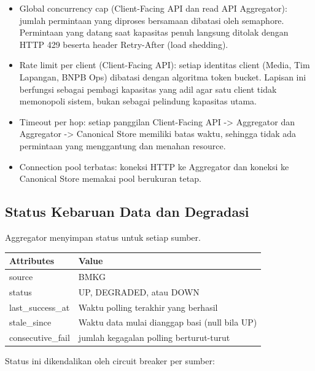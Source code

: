 \begin{itemize}
\tightlist
\item
  Global concurrency cap (Client-Facing API dan read API Aggregator): jumlah permintaan yang diproses bersamaan dibatasi oleh semaphore. Permintaan yang datang saat kapasitas penuh langsung ditolak dengan HTTP 429 beserta header Retry-After (load shedding).\\
\item
  Rate limit per client (Client-Facing API): setiap identitas client (Media, Tim Lapangan, BNPB Ops) dibatasi dengan algoritma token bucket. Lapisan ini berfungsi sebagai pembagi kapasitas yang adil agar satu client tidak memonopoli sistem, bukan sebagai pelindung kapasitas utama.\\
\item
  Timeout per hop: setiap panggilan Client-Facing API -\textgreater{} Aggregator dan Aggregator -\textgreater{} Canonical Store memiliki batas waktu, sehingga tidak ada permintaan yang menggantung dan menahan resource.\\
\item
  Connection pool terbatas: koneksi HTTP ke Aggregator dan koneksi ke Canonical Store memakai pool berukuran tetap.
\end{itemize}

\subsection{Status Kebaruan Data dan Degradasi}\label{sec:p2-degradasi}

Aggregator menyimpan status untuk setiap sumber.

\begin{longtable}[]{|>{\raggedright\arraybackslash}p{\dimexpr(\linewidth-4\tabcolsep)/2\relax}|>{\raggedright\arraybackslash}p{\dimexpr(\linewidth-4\tabcolsep)/2\relax}|}
\hline
Attributes & Value \\
\hline
\endhead
\endlastfoot
source & BMKG \\
\hline
status & UP, DEGRADED, atau DOWN \\
\hline
last\_success\_at & Waktu polling terakhir yang berhasil \\
\hline
stale\_since & Waktu data mulai dianggap basi (null bila UP) \\
\hline
consecutive\_fail & jumlah kegagalan polling berturut-turut \\
\hline
\end{longtable}

Status ini dikendalikan oleh circuit breaker per sumber:

